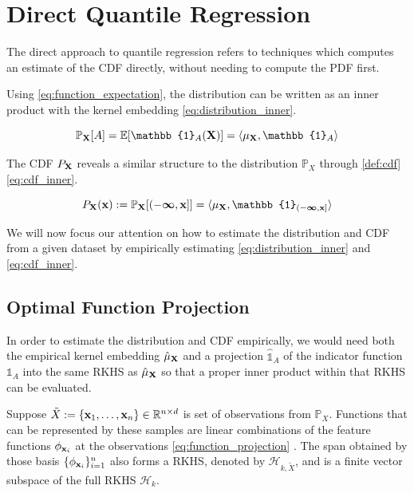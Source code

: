 \documentclass[twoside]{article} \usepackage{aistats2017}
\theoremstyle{definition}
\theoremstyle{theorem}
\newcommand{\rv}[1]{{#1}}
\newcommand{\ds}[1]{\tilde{#1}}
\begin{document}
\section{Direct Quantile Regression}
\label{sec:direct_quantile_regression}

	The direct approach to quantile regression refers to techniques which computes an estimate of the CDF directly, without needing to compute the PDF first.
	
	Using \eqref{eq:function_expectation}, the distribution can be written as an inner product with the kernel embedding \eqref{eq:distribution_inner}.
		
	\begin{equation}
		\mathbb{P}_{\bvec{\rv{X}}}[A] = \mathbb{E}[\mathbb{1}_{A}(\bvec{\rv{X}})] = \langle \mu_{\bvec{\rv{X}}}, \mathbb{1}_{A} \rangle
	\label{eq:distribution_inner}
	\end{equation}

	The CDF  $P_{\bvec{\rv{X}}}$ reveals a similar structure to the distribution $\mathbb{P}_{\rv{X}}$ through \cref{def:cdf} \eqref{eq:cdf_inner}.
			
	\begin{equation}
		P_{\bvec{\rv{X}}}(\bvec{x}) := \mathbb{P}_{\bvec{\rv{X}}}[(-\bm{\infty}, \bvec{x}]] = \langle \mu_{\bvec{\rv{X}}}, \mathbb{1}_{(-\bm{\infty}, \bvec{x}]} \rangle
	\label{eq:cdf_inner}
	\end{equation}

	We will now focus our attention on how to estimate the distribution and CDF from a given dataset by empirically estimating \eqref{eq:distribution_inner} and \eqref{eq:cdf_inner}.
	
	\subsection{Optimal Function Projection}
	\label{sec:direct_quantile_regression:optimal_function_approximation}
	
		In order to estimate the distribution and CDF empirically, we would need both the empirical kernel embedding $\hat{\mu}_{\bvec{\rv{X}}}$ and a projection $\hat{\mathbb{1}}_{A}$ of the indicator function $\mathbb{1}_{A}$ into the same RKHS as $\hat{\mu}_{\bvec{\rv{X}}}$ so that a proper inner product within that RKHS can be evaluated.

		Suppose $\ds{X} := \{\bvec{x}_{1}, \dots, \bvec{x}_{n}\} \in \mathbb{R}^{n \times d}$ is set of observations from $\mathbb{P}_{\rv{X}}$. Functions that can be represented by these samples are linear combinations of the feature functions $\phi_{\mathbf{x}_{i}}$ at the observations \eqref{eq:function_projection} \citep{muandet2016kernel}. The span obtained by those basis $\{\phi_{\mathbf{x}_{i}}\}_{i = 1}^{n}$ also forms a RKHS, denoted by $\mathcal{H}_{k, \ds{X}}$, and is a finite vector subspace of the full RKHS $\mathcal{H}_{k}$.
		
\end{document}
